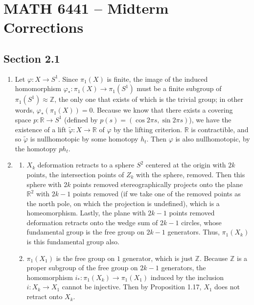 \documentclass[a4paper,12pt]{article}
\begin{document}
\section*{MATH 6441 -- Midterm Corrections}
\subsection*{Section 2.1}
\begin{enumerate}
    \item
        Let $\varphi : X \to S^1$. Since $\pi_1(X)$ is finite, the image of the induced homomorphism $\varphi_* : \pi_1(X) \to \pi_1(S^1)$ must be a finite subgroup of $\pi_1(S^1) \approx \mathbb{Z}$, the only one that exists of which is the trivial group; in other words, $\varphi_*(\pi_1(X)) = 0$. Because we know that there exists a covering space $p : \mathbb{R} \to S^1$ (defined by $p(s) = (\cos 2\pi s, \sin 2\pi s)$), we have the existence of a lift $\tilde{\varphi} : X \to \mathbb{R}$ of $\varphi$ by the lifting criterion. $\mathbb{R}$ is contractible, and so $\tilde{\varphi}$ is nullhomotopic by some homotopy $h_t$. Then $\varphi$ is also nullhomotopic, by the homotopy $p h_t$.

    \item
        \begin{enumerate}[label=(\alph*)]
            \item
                $X_k$ deformation retracts to a sphere $S^2$ centered at the origin with $2k$ points, the intersection points of $Z_k$ with the sphere, removed. Then this sphere with $2k$ points removed stereographically projects onto the plane $\mathbb{R}^2$ with $2k - 1$ points removed (if we take one of the removed points as the north pole, on which the projection is undefined), which is a homeomorphism. Lastly, the plane with $2k - 1$ points removed deformation retracts onto the wedge sum of $2k - 1$ circles, whose fundamental group is the free group on $2k - 1$ generators. Thus, $\pi_1(X_k)$ is this fundamental group also.
            \item
                $\pi_1(X_1)$ is the free group on $1$ generator, which is just $\mathbb{Z}$. Because $\mathbb{Z}$ is a proper subgroup of the free group on $2k - 1$ generators, the homomorphism $i_* : \pi_1(X_k) \to \pi_1(X_1)$ induced by the inclusion $i : X_k \to X_1$ cannot be injective. Then by Proposition 1.17, $X_1$ does not retract onto $X_k$.
        \end{enumerate}


\end{enumerate}
\end{document}
